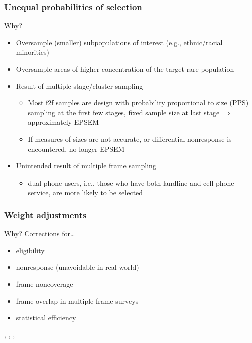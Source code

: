 \documentclass{beamer}
\begin{document}
\begin{frame}\frametitle{Unequal probabilities of selection}

Why?

\begin{itemize}
    \item Oversample (smaller) subpopulations of interest (e.g., ethnic/racial minorities)
    \item Oversample areas of higher concentration of the target rare population
    \item Result of multiple stage/cluster sampling
    \begin{itemize}
        \item Most f2f samples are design with probability proportional to size (PPS) sampling at the first few stages,
            fixed sample size at last stage $\Rightarrow$ approximately EPSEM
        \item If measures of sizes are not accurate, or differential nonresponse is encountered, no longer EPSEM
    \end{itemize}
    \item Unintended result of multiple frame sampling
        \begin{itemize}
            \item dual phone users, i.e., those who have both landline and cell phone service, are more likely to be selected
        \end{itemize}
\end{itemize}

\end{frame}

\begin{frame}\frametitle{Weight adjustments}

Why? Corrections for\ldots

\begin{itemize}
    \item eligibility
    \item nonresponse (unavoidable in real world)
    \item frame noncoverage
    \item frame overlap in multiple frame surveys
    \item statistical efficiency
\end{itemize}

\citet{kalton:flores:cervantes:2003},
\citet{valliant:dever:kreuter:2013},
\citet{valliant:dever:2017},
\citet{kolenikov:2016}

\end{frame}
\end{document}
